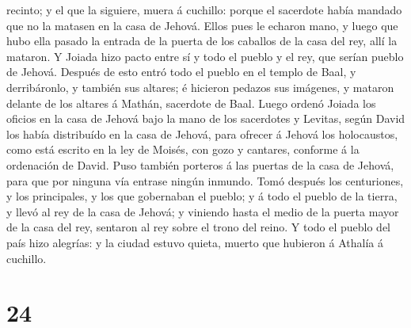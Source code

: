 recinto; y el que la siguiere, muera á cuchillo: porque el sacerdote
había mandado que no la matasen en la casa de Jehová. 
Ellos pues le echaron mano, y luego que hubo ella pasado la entrada de
la puerta de los caballos de la casa del rey, allí la mataron.
 Y Joiada hizo pacto entre sí y todo el pueblo y el rey,
que serían pueblo de Jehová.  Después de esto entró todo
el pueblo en el templo de Baal, y derribáronlo, y también sus altares; é
hicieron pedazos sus imágenes, y mataron delante de los altares á
Mathán, sacerdote de Baal.  Luego ordenó Joiada los
oficios en la casa de Jehová bajo la mano de los sacerdotes y Levitas,
según David los había distribuído en la casa de Jehová, para ofrecer á
Jehová los holocaustos, como está escrito en la ley de Moisés, con gozo
y cantares, conforme á la ordenación de David.  Puso
también porteros á las puertas de la casa de Jehová, para que por
ninguna vía entrase ningún inmundo.  Tomó después los
centuriones, y los principales, y los que gobernaban el pueblo; y á todo
el pueblo de la tierra, y llevó al rey de la casa de Jehová; y viniendo
hasta el medio de la puerta mayor de la casa del rey, sentaron al rey
sobre el trono del reino.  Y todo el pueblo del país hizo
alegrías: y la ciudad estuvo quieta, muerto que hubieron á Athalía á
cuchillo.

\hypertarget{section-23}{%
\section{24}\label{section-23}}

